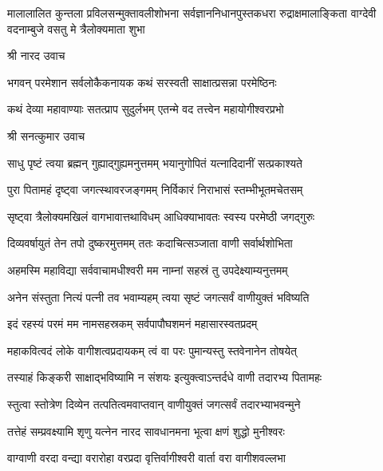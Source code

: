 
{मालालालित कुन्तला प्रविलसन्मुक्तावलीशोभना}
{सर्वज्ञाननिधानपुस्तकधरा रुद्राक्षमालाङ्किता}
{वाग्देवी वदनाम्बुजे वसतु मे त्रैलोक्यमाता शुभा}

श्री नारद उवाच

\twolineshloka
{भगवन् परमेशान सर्वलोकैकनायक}
{कथं सरस्वती साक्षात्प्रसन्ना परमेष्ठिनः}%

\twolineshloka
{कथं देव्या महावाण्याः सतत्प्राप सुदुर्लभम्}
{एतन्मे वद तत्त्वेन महायोगीश्वरप्रभो}%


श्री सनत्कुमार उवाच

\twolineshloka
{साधु पृष्टं त्वया ब्रह्मन् गुह्याद्गुह्यमनुत्तमम्}
{भयानुगोपितं यत्नादिदानीं सत्प्रकाश्यते}%

\twolineshloka
{पुरा पितामहं दृष्ट्वा जगत्स्थावरजङ्गमम्}
{निर्विकारं निराभासं स्तम्भीभूतमचेतसम्}%

\twolineshloka
{सृष्ट्वा त्रैलोक्यमखिलं वागभावात्तथाविधम्}
{आधिक्याभावतः स्वस्य परमेष्ठी जगद्गुरुः}%

\twolineshloka
{दिव्यवर्षायुतं तेन तपो दुष्करमुत्तमम्}
{ततः कदाचित्सञ्जाता वाणी सर्वार्थशोभिता}%

\twolineshloka
{अहमस्मि महाविद्या सर्ववाचामधीश्वरी}
{मम नाम्नां सहस्रं तु उपदेक्ष्याम्यनुत्तमम्}%

\twolineshloka
{अनेन संस्तुता नित्यं पत्नी तव भवाम्यहम्}
{त्वया सृष्टं जगत्सर्वं वाणीयुक्तं भविष्यति}%

\twolineshloka
{इदं रहस्यं परमं मम नामसहस्रकम्}
{सर्वपापौघशमनं महासारस्वतप्रदम्}%

\twolineshloka
{महाकवित्वदं लोके वागीशत्वप्रदायकम्}
{त्वं वा परः पुमान्यस्तु स्तवेनानेन तोषयेत्}%

\twolineshloka
{तस्याहं किङ्करी साक्षाद्भविष्यामि न संशयः}
{इत्युक्त्वाऽन्तर्दधे वाणी तदारभ्य पितामहः}%

\twolineshloka
{स्तुत्वा स्तोत्रेण दिव्येन तत्पतित्वमवाप्तवान्}
{वाणीयुक्तं जगत्सर्वं तदारभ्याभवन्मुने}%

\twolineshloka
{तत्तेहं सम्प्रवक्ष्यामि शृणु यत्नेन नारद}
{सावधानमना भूत्वा क्षणं शुद्धो मुनीश्वरः}%




 \resetShloka


\twolineshloka
{वाग्वाणी वरदा वन्द्या वरारोहा वरप्रदा}
{वृत्तिर्वागीश्वरी वार्ता वरा वागीशवल्लभा}%

